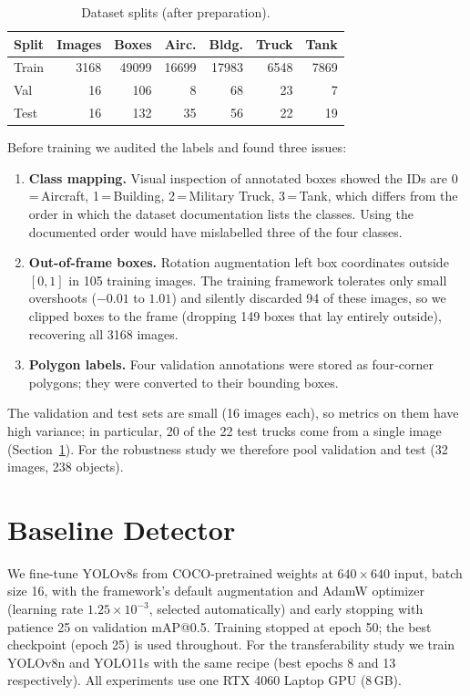 \documentclass[conference]{IEEEtran}
\begin{document}
\begin{table}[t]
\centering
\caption{Dataset splits (after preparation).}
\label{tab:data}
\begin{tabular}{lrrrrrr}
\toprule
Split & Images & Boxes & Airc. & Bldg. & Truck & Tank \\
\midrule
Train & 3168 & 49099 & 16699 & 17983 & 6548 & 7869 \\
Val   & 16   & 106   & 8     & 68    & 23   & 7 \\
Test  & 16   & 132   & 35    & 56    & 22   & 19 \\
\bottomrule
\end{tabular}
\end{table}

Before training we audited the labels and found three issues:
\begin{enumerate}
\item \textbf{Class mapping.} Visual inspection of annotated boxes showed the IDs are
0\,=\,Aircraft, 1\,=\,Building, 2\,=\,Military Truck, 3\,=\,Tank, which differs from the
order in which the dataset documentation lists the classes. Using the documented order would
have mislabelled three of the four classes.
\item \textbf{Out-of-frame boxes.} Rotation augmentation left box coordinates outside
$[0,1]$ in 105 training images. The training framework tolerates only small overshoots
($-0.01$ to $1.01$) and silently discarded 94 of these images, so we clipped boxes to the frame (dropping 149 boxes that lay entirely outside), recovering
all 3168 images.
\item \textbf{Polygon labels.} Four validation annotations were stored as four-corner
polygons; they were converted to their bounding boxes.
\end{enumerate}
The validation and test sets are small (16 images each), so metrics on them have high
variance; in particular, 20 of the 22 test trucks come from a single image
(Section~\ref{sec:baseline}). For the robustness study we therefore pool validation and test
(32 images, 238 objects).

\section{Baseline Detector}
\label{sec:baseline}
We fine-tune YOLOv8s \cite{jocher2023yolov8} from COCO-pretrained weights \cite{lin2014coco}
at $640\times640$ input, batch size 16, with the framework's default augmentation and AdamW
optimizer (learning rate $1.25\times10^{-3}$, selected automatically) and early stopping with
patience 25 on validation mAP@0.5. Training stopped at epoch 50; the best checkpoint
(epoch 25) is used throughout. For the transferability study we train YOLOv8n
\cite{jocher2023yolov8} and YOLO11s \cite{jocher2024yolo11} with the same recipe (best
epochs 8 and 13 respectively). All experiments use one RTX 4060 Laptop GPU (8\,GB).
\end{document}
